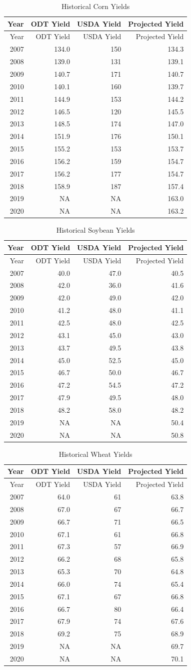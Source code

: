 \documentclass[]{article}
\begin{document}
\begin{longtable}[]{@{}rrrr@{}}
\caption{Historical Corn Yields}\tabularnewline
\toprule
Year & ODT Yield & USDA Yield & Projected Yield\tabularnewline
\midrule
\endfirsthead
\toprule
Year & ODT Yield & USDA Yield & Projected Yield\tabularnewline
\midrule
\endhead
2007 & 134.0 & 150 & 134.3\tabularnewline
2008 & 139.0 & 131 & 139.1\tabularnewline
2009 & 140.7 & 171 & 140.7\tabularnewline
2010 & 140.1 & 160 & 139.7\tabularnewline
2011 & 144.9 & 153 & 144.2\tabularnewline
2012 & 146.5 & 120 & 145.5\tabularnewline
2013 & 148.5 & 174 & 147.0\tabularnewline
2014 & 151.9 & 176 & 150.1\tabularnewline
2015 & 155.2 & 153 & 153.7\tabularnewline
2016 & 156.2 & 159 & 154.7\tabularnewline
2017 & 156.2 & 177 & 154.7\tabularnewline
2018 & 158.9 & 187 & 157.4\tabularnewline
2019 & NA & NA & 163.0\tabularnewline
2020 & NA & NA & 163.2\tabularnewline
\bottomrule
\end{longtable}

\begin{longtable}[]{@{}rrrr@{}}
\caption{Historical Soybean Yields}\tabularnewline
\toprule
Year & ODT Yield & USDA Yield & Projected Yield\tabularnewline
\midrule
\endfirsthead
\toprule
Year & ODT Yield & USDA Yield & Projected Yield\tabularnewline
\midrule
\endhead
2007 & 40.0 & 47.0 & 40.5\tabularnewline
2008 & 42.0 & 36.0 & 41.6\tabularnewline
2009 & 42.0 & 49.0 & 42.0\tabularnewline
2010 & 41.2 & 48.0 & 41.1\tabularnewline
2011 & 42.5 & 48.0 & 42.5\tabularnewline
2012 & 43.1 & 45.0 & 43.0\tabularnewline
2013 & 43.7 & 49.5 & 43.8\tabularnewline
2014 & 45.0 & 52.5 & 45.0\tabularnewline
2015 & 46.7 & 50.0 & 46.7\tabularnewline
2016 & 47.2 & 54.5 & 47.2\tabularnewline
2017 & 47.9 & 49.5 & 48.0\tabularnewline
2018 & 48.2 & 58.0 & 48.2\tabularnewline
2019 & NA & NA & 50.4\tabularnewline
2020 & NA & NA & 50.8\tabularnewline
\bottomrule
\end{longtable}

\begin{longtable}[]{@{}rrrr@{}}
\caption{Historical Wheat Yields}\tabularnewline
\toprule
Year & ODT Yield & USDA Yield & Projected Yield\tabularnewline
\midrule
\endfirsthead
\toprule
Year & ODT Yield & USDA Yield & Projected Yield\tabularnewline
\midrule
\endhead
2007 & 64.0 & 61 & 63.8\tabularnewline
2008 & 67.0 & 67 & 66.7\tabularnewline
2009 & 66.7 & 71 & 66.5\tabularnewline
2010 & 67.1 & 61 & 66.8\tabularnewline
2011 & 67.3 & 57 & 66.9\tabularnewline
2012 & 66.2 & 68 & 65.8\tabularnewline
2013 & 65.3 & 70 & 64.8\tabularnewline
2014 & 66.0 & 74 & 65.4\tabularnewline
2015 & 67.1 & 67 & 66.8\tabularnewline
2016 & 66.7 & 80 & 66.4\tabularnewline
2017 & 67.9 & 74 & 67.6\tabularnewline
2018 & 69.2 & 75 & 68.9\tabularnewline
2019 & NA & NA & 69.7\tabularnewline
2020 & NA & NA & 70.1\tabularnewline
\bottomrule
\end{longtable}
\end{document}
